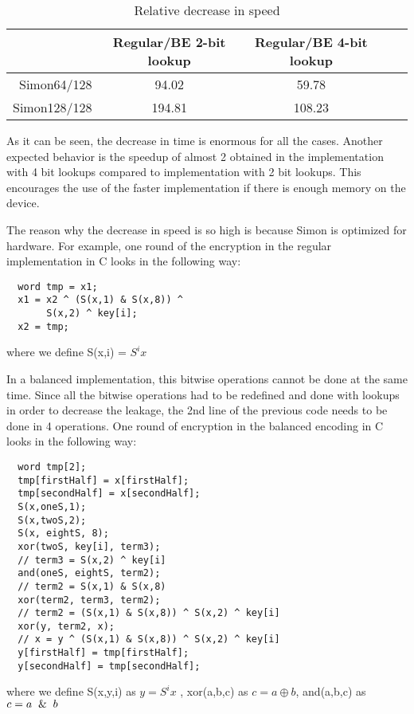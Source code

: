 \documentclass[conference]{IEEEtran}
\begin{document}
\begin{table}[htbp]
  \renewcommand{\arraystretch}{1.3}
  \caption{Relative decrease in speed}
  \vspace{0.05 in}
  \label{tab:space2}
  \centering
  \begin{tabular}{r|cccp{0.5in}}
    ~ & Regular/BE 2-bit lookup & Regular/BE 4-bit lookup \\ \hline
    Simon64/128  & 94.02 & 59.78\\
    Simon128/128 & 194.81 & 108.23\\
  \end{tabular}
\end{table}

As it can be seen, the decrease in time is enormous for all the cases. Another expected behavior is the speedup of almost 2 obtained in the implementation with 4 bit lookups compared to implementation with 2 bit lookups. This encourages the use of the faster implementation if there is enough memory on the device.

The reason why the decrease in speed is so high is because Simon is optimized for hardware. For example, one round of the encryption in the regular implementation in C looks in the following way:
\begin{lstlisting}
  word tmp = x1;
  x1 = x2 ^ (S(x,1) & S(x,8)) ^
       S(x,2) ^ key[i];
  x2 = tmp;
\end{lstlisting}
where we define S(x,i) = $S^{i}x$

In a balanced implementation, this bitwise operations cannot be done at the same time. Since all the bitwise operations had to be redefined and done with lookups in order to decrease the leakage, the 2nd line of the previous code needs to be done in 4 operations. One round of encryption in the balanced encoding in C looks in the following way:
\begin{lstlisting}
  word tmp[2];
  tmp[firstHalf] = x[firstHalf];
  tmp[secondHalf] = x[secondHalf];
  S(x,oneS,1);
  S(x,twoS,2);
  S(x, eightS, 8);
  xor(twoS, key[i], term3);
  // term3 = S(x,2) ^ key[i]
  and(oneS, eightS, term2);
  // term2 = S(x,1) & S(x,8)
  xor(term2, term3, term2);
  // term2 = (S(x,1) & S(x,8)) ^ S(x,2) ^ key[i]
  xor(y, term2, x);
  // x = y ^ (S(x,1) & S(x,8)) ^ S(x,2) ^ key[i]
  y[firstHalf] = tmp[firstHalf];
  y[secondHalf] = tmp[secondHalf];
\end{lstlisting}
where we define S(x,y,i) as $ y = S^{i}x$ , xor(a,b,c) as $ c = a \oplus b $,
and(a,b,c) as $c = a \And b$
\end{document}
